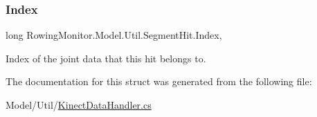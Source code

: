 \subsubsection{\texorpdfstring{Index}{Index}}
{\footnotesize\ttfamily long Rowing\+Monitor.\+Model.\+Util.\+Segment\+Hit.\+Index\hspace{0.3cm}{\ttfamily [get]}, {\ttfamily [set]}}



Index of the joint data that this hit belongs to. 



The documentation for this struct was generated from the following file\+:\begin{DoxyCompactItemize}
\item 
Model/\+Util/\hyperlink{_kinect_data_handler_8cs}{Kinect\+Data\+Handler.\+cs}\end{DoxyCompactItemize}
